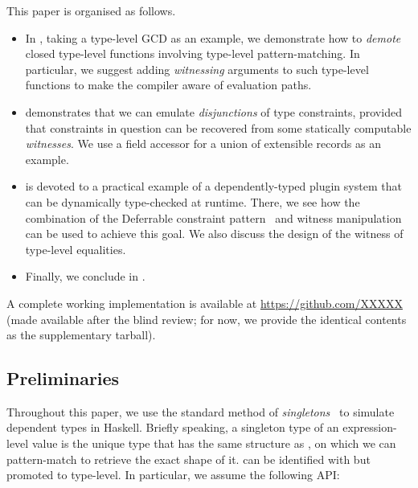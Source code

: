 \documentclass[demotion-paper.tex]{subfiles}
\begin{document}
This paper is organised as follows.
\begin{itemize}
  \item In , taking a type-level GCD as an example, we demonstrate how to \emph{demote} closed type-level functions involving type-level pattern-matching.
  In particular, we suggest adding \emph{witnessing} arguments to such type-level functions to make the compiler aware of evaluation paths.
  \item {} demonstrates that we can emulate \emph{disjunctions} of type constraints, provided that constraints in question can be recovered from some statically computable \emph{witnesses}.
  We use a field accessor for a union of extensible records as an example.
  \item {} is devoted to a practical example of a dependently-typed plugin system that can be dynamically type-checked at runtime.
  There, we see how the combination of the Deferrable constraint pattern~\cite{Kmett:2020ab} and witness manipulation can be used to achieve this goal.
  We also discuss the design of the witness of type-level equalities.
  \item Finally, we conclude in .
\end{itemize}

A complete working implementation is available at \url{https://github.com/XXXXX} (made available after the blind review; for now, we provide the identical contents as the supplementary tarball).

\subsection{Preliminaries}
Throughout this paper, we use the standard method of \emph{singletons}~\cite{Eisenberg:2012} to simulate dependent types in Haskell.
Briefly speaking, a singleton type  of an expression-level value  is the unique type that has the same structure as , on which we can pattern-match to retrieve the exact shape of it.  can be identified with  but promoted to type-level.
In particular, we assume the following API:
\end{document}
